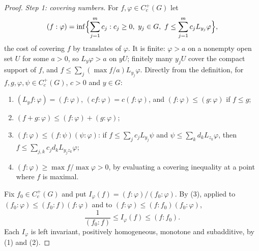 \begin{proof}
\emph{Step 1: covering numbers.} For $f, \varphi \in C_c^+(G)$ let
\[
(f : \varphi) = \inf\Bigl\{\sum_{j=1}^mc_j : c_j \geq 0, \ y_j \in G, \ f \leq \sum_{j=1}^mc_jL_{y_j}\varphi\Bigr\},
\]
the cost of covering $f$ by translates of $\varphi$. It is finite: $\varphi > a$ on a nonempty open set $U$ for some $a > 0$, so $L_y\varphi > a$ on $yU$; finitely many $y_jU$ cover the compact support of $f$,
and $f \leq \sum_j(\max f/a)L_{y_j}\varphi$. Directly from the definition, for $f, g, \varphi, \psi \in C_c^+(G)$, $c > 0$ and $y \in G$:
\begin{enumerate}
\item $(L_yf : \varphi) = (f : \varphi)$, $(cf : \varphi) = c(f : \varphi)$, and $(f : \varphi) \leq (g : \varphi)$ if $f \leq g$;
\item $(f + g : \varphi) \leq (f : \varphi) + (g : \varphi)$;
\item $(f : \varphi) \leq (f : \psi)(\psi : \varphi)$: if $f \leq \sum_jc_jL_{y_j}\psi$ and $\psi \leq \sum_kd_kL_{z_k}\varphi$, then $f \leq \sum_{j,k}c_jd_kL_{y_jz_k}\varphi$;
\item $(f : \varphi) \geq \max f/\max\varphi > 0$, by evaluating a covering inequality at a point where $f$ is maximal.
\end{enumerate}
Fix $f_0 \in C_c^+(G)$ and put $I_\varphi(f) = (f : \varphi)/(f_0 : \varphi)$. By (3), applied to $(f_0 : \varphi) \leq (f_0 : f)(f : \varphi)$ and to $(f : \varphi) \leq (f : f_0)(f_0 : \varphi)$,
\begin{equation}\label{radon-measures:equation-haar-bounds}
\frac{1}{(f_0 : f)} \leq I_\varphi(f) \leq (f : f_0).
\end{equation}
Each $I_\varphi$ is left invariant, positively homogeneous, monotone and subadditive, by (1) and (2).


\end{proof}
